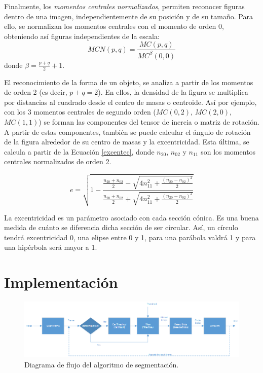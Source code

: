 Finalmente, los \textit{momentos centrales normalizados}, permiten reconocer figuras dentro de una imagen, independientemente de su posición y de su tamaño. Para ello, se normalizan los momentos centrales con el momento de orden $0$, obteniendo así figuras independientes de la escala: $$MCN(p,q) = \frac{MC(p,q)}{MC^{\beta}(0,0)}$$ donde ${\beta}=\frac{p+q}{2}+1$.

El reconocimiento de la forma de un objeto, se analiza a partir de los momentos de orden 2 (es decir, $p+q=2$). En ellos, la densidad de la figura se multiplica por distancias al cuadrado desde el centro de masas o centroide. Así por ejemplo, con los 3 momentos centrales de segundo orden ($MC(0,2)$, $MC(2,0)$, $MC(1,1)$) se forman las componentes del tensor de inercia o matriz de rotación. A partir de estas componentes, también se puede calcular el ángulo de rotación de la figura alrededor de su centro de masas y la excentricidad. Esta última, se calcula a partir de la Ecuación \ref{excentec}, donde $n_{20}$, $n_{02}$ y $n_{11}$ son los momentos centrales normalizados de orden 2.

\begin{equation}
e = \sqrt{1-\frac{\frac{n_{20}+n_{02}}{2}-\sqrt{4n_{11}^2+\frac{(n_{20}-n_{02})^2}{2}}}{\frac{n_{20}+n_{02}}{2}+\sqrt{4n_{11}^2+\frac{(n_{20}-n_{02})^2}{2}}}}
\label{excentec}
\end{equation}

La excentricidad es un parámetro asociado con cada sección cónica. Es una buena medida de cuánto se diferencia dicha sección de ser circular. Así, un círculo tendrá excentricidad 0, una elipse entre 0 y 1, para una parábola valdrá 1 y para una hipérbola será mayor a 1.

\section{Implementación}
\label{implementSegment}

\begin{figure}[ht!]
\hspace{-1.5cm}
\includegraphics[scale=0.7]{img/diagrama_segmentacion.png}
\caption{Diagrama de flujo del algoritmo de segmentación.}
\label{diagramaSegmentacion}
\end{figure}

